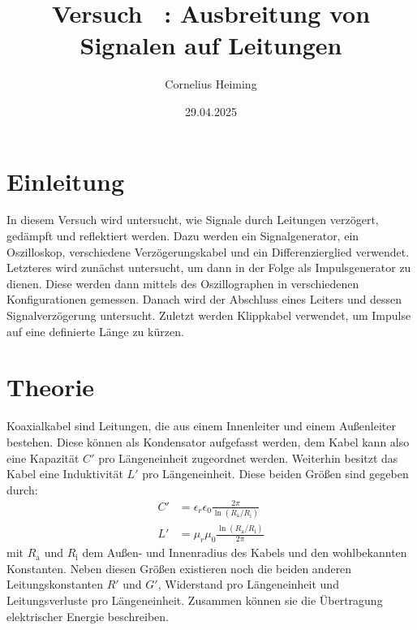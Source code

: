 \documentclass[ngerman]{scrartcl}
\author{Cornelius Heiming}
\title{Versuch \nummer~:  Ausbreitung von Signalen auf Leitungen}
\date{29.04.2025}
\theoremstyle{definition}
\begin{document}
	\maketitle
	\section{Einleitung}
		In diesem Versuch wird untersucht, wie Signale durch Leitungen verzögert, gedämpft und reflektiert werden. Dazu werden ein Signalgenerator, ein Oszilloskop, verschiedene Verzögerungskabel und ein Differenzierglied verwendet. Letzteres wird zunächst untersucht, um dann in der Folge als Impulsgenerator zu dienen. Diese werden dann mittels des Oszillographen in verschiedenen Konfigurationen gemessen. Danach wird der Abschluss eines Leiters und dessen Signalverzögerung untersucht. Zuletzt werden Klippkabel verwendet, um Impulse auf eine definierte Länge zu kürzen.
	\section{Theorie}
		
		Koaxialkabel sind Leitungen, die aus einem Innenleiter und einem Außenleiter bestehen. Diese können als Kondensator aufgefasst werden, dem Kabel kann also eine Kapazität $C'$ pro Längeneinheit zugeordnet werden. Weiterhin besitzt das Kabel eine Induktivität $L'$ pro Längeneinheit. Diese beiden Größen sind gegeben durch:
		\begin{align*}
			C' &= \epsilon_r \epsilon_0\frac{2 \pi}{\ln({R_\mathrm{a}/R_\mathrm{i}})}\\
			L' &= \mu_r \mu_0\frac{\ln({R_\mathrm{a}/R_\mathrm{i}})}{2 \pi}
		\end{align*}
		mit $R_\mathrm{a}$ und $R_\mathrm{i}$ dem Außen- und Innenradius des Kabels und den wohlbekannten Konstanten. Neben diesen Größen existieren noch die beiden anderen Leitungskonstanten $R'$ und $G'$, Widerstand pro Längeneinheit und Leitungsverluste pro Längeneinheit. Zusammen können sie die Übertragung elektrischer Energie beschreiben. 
\end{document}

